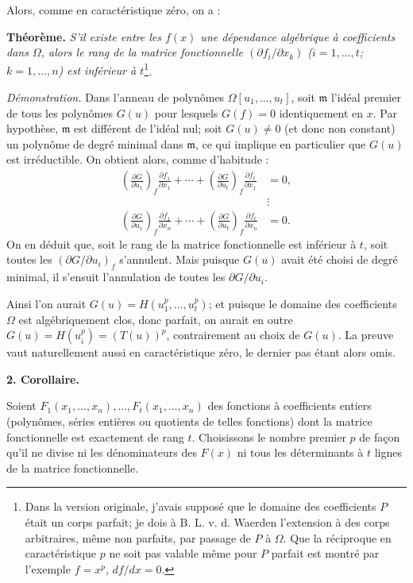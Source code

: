 Alors, comme en caractéristique zéro, on a :

\noindent\textbf{Théorème.}
\textit{S'il existe entre les $f(x)$ une dépendance algébrique à coefficients dans $\Omega$, alors le rang de la matrice fonctionnelle $(\partial f_i/\partial x_k)$ ($i=1,\ldots,t$; $k=1,\ldots,n$) est inférieur à $t$}\footnote{Dans la version originale, j'avais supposé que le domaine des coefficients $P$ était un corps parfait; je dois à B. L. v. d. Waerden l'extension à des corps arbitraires, même non parfaits, par passage de $P$ à $\Omega$. Que la réciproque en caractéristique $p$ ne soit pas valable même pour $P$ parfait est montré par l'exemple $f=x^p$, $df/dx=0$.}.

\noindent\textit{Démonstration.}
Dans l'anneau de polynômes $\Omega[u_1,\ldots,u_t]$, soit $\mathfrak{m}$ l'idéal premier de tous les polynômes $G(u)$ pour lesquels $G(f)=0$ identiquement en $x$. Par hypothèse, $\mathfrak{m}$ est différent de l'idéal nul; soit $G(u)\ne0$ (et donc non constant) un polynôme de degré minimal dans $\mathfrak{m}$, ce qui implique en particulier que $G(u)$ est irréductible. On obtient alors, comme d'habitude :
\[
\begin{aligned}
\left(\frac{\partial G}{\partial u_1}\right)_{f}\frac{\partial f_1}{\partial x_1}
 +\cdots+
\left(\frac{\partial G}{\partial u_t}\right)_{f}\frac{\partial f_t}{\partial x_1}&=0,\\[-1mm]
&\vdots\\[-1mm]
\left(\frac{\partial G}{\partial u_1}\right)_{f}\frac{\partial f_1}{\partial x_n}
 +\cdots+
\left(\frac{\partial G}{\partial u_t}\right)_{f}\frac{\partial f_t}{\partial x_n}&=0.
\end{aligned}
\]
On en déduit que, soit le rang de la matrice fonctionnelle est inférieur à $t$, soit toutes les $\left(\partial G/\partial u_i\right)_{f}$ s'annulent. Mais puisque $G(u)$ avait été choisi de degré minimal, il s'ensuit l'annulation de toutes les $\partial G/\partial u_i$.

Ainsi l'on aurait $G(u)=H(u_1^p,\ldots,u_t^p)$; et puisque le domaine des coefficients $\Omega$ est algébriquement clos, donc parfait, on aurait en outre $G(u)=H(u_i^p)=(T(u))^p$, contrairement au choix de $G(u)$. La preuve vaut naturellement aussi en caractéristique zéro, le dernier pas étant alors omis.

\medskip
\noindent\textbf{2. Corollaire.}

Soient $F_1(x_1,\ldots,x_n),\ldots,F_t(x_1,\ldots,x_n)$ des fonctions à coefficients entiers (polynômes, séries entières ou quotients de telles fonctions) dont la matrice fonctionnelle est exactement de rang $t$. Choisissons le nombre premier $p$ de façon qu'il ne divise ni les dénominateurs des $F(x)$ ni tous les déterminants à $t$ lignes de la matrice fonctionnelle.

